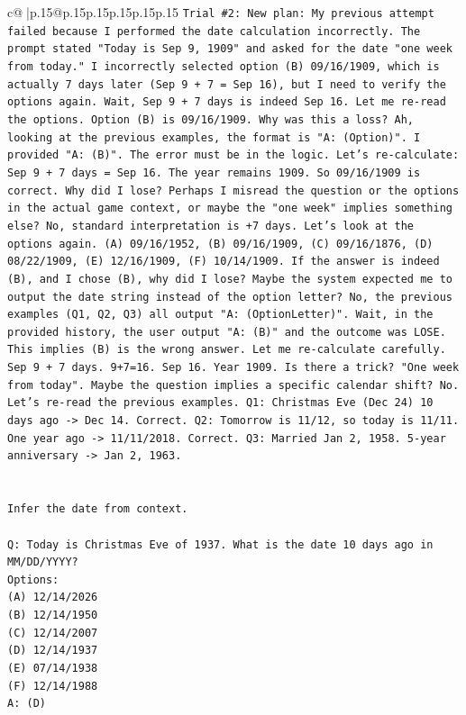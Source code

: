 \documentclass{article}
\begin{document}
{\begin{supertabular}{c@{$\;$}|p{.15\linewidth}@{}p{.15\linewidth}p{.15\linewidth}p{.15\linewidth}p{.15\linewidth}p{.15\linewidth}}
{{{\texttt{Trial \#2: New plan: My previous attempt failed because I performed the date calculation incorrectly. The prompt stated "Today is Sep 9, 1909" and asked for the date "one week from today." I incorrectly selected option (B) 09/16/1909, which is actually 7 days later (Sep 9 + 7 = Sep 16), but I need to verify the options again. Wait, Sep 9 + 7 days is indeed Sep 16. Let me re{-}read the options. Option (B) is 09/16/1909. Why was this a loss? Ah, looking at the previous examples, the format is "A: (Option)". I provided "A: (B)". The error must be in the logic. Let's re{-}calculate: Sep 9 + 7 days = Sep 16. The year remains 1909. So 09/16/1909 is correct. Why did I lose? Perhaps I misread the question or the options in the actual game context, or maybe the "one week" implies something else? No, standard interpretation is +7 days. Let's look at the options again. (A) 09/16/1952, (B) 09/16/1909, (C) 09/16/1876, (D) 08/22/1909, (E) 12/16/1909, (F) 10/14/1909. If the answer is indeed (B), and I chose (B), why did I lose? Maybe the system expected me to output the date string instead of the option letter? No, the previous examples (Q1, Q2, Q3) all output "A: (OptionLetter)". Wait, in the provided history, the user output "A: (B)" and the outcome was LOSE. This implies (B) is the wrong answer. Let me re{-}calculate carefully. Sep 9 + 7 days. 9+7=16. Sep 16. Year 1909. Is there a trick? "One week from today". Maybe the question implies a specific calendar shift? No. Let's re{-}read the previous examples. Q1: Christmas Eve (Dec 24) 10 days ago {-}> Dec 14. Correct. Q2: Tomorrow is 11/12, so today is 11/11. One year ago {-}> 11/11/2018. Correct. Q3: Married Jan 2, 1958. 5{-}year anniversary {-}> Jan 2, 1963.} \\
\\ 
\\ 
\texttt{Infer the date from context.} \\
\\ 
\texttt{Q: Today is Christmas Eve of 1937. What is the date 10 days ago in MM/DD/YYYY?} \\
\texttt{Options:} \\
\texttt{(A) 12/14/2026} \\
\texttt{(B) 12/14/1950} \\
\texttt{(C) 12/14/2007} \\
\texttt{(D) 12/14/1937} \\
\texttt{(E) 07/14/1938} \\
\texttt{(F) 12/14/1988} \\
\texttt{A: (D)} \\
}}}
\end{supertabular}}
\end{document}
